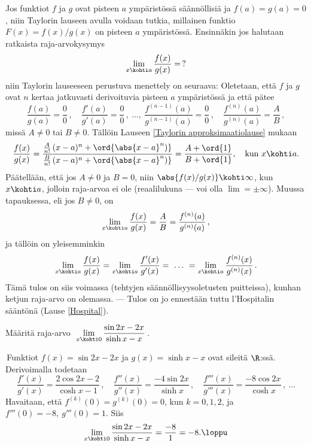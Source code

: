 Jos funktiot $f$ ja $g$ ovat pisteen $a$ ympäristössä säännöllisiä ja $f(a)=g(a)=0$, niin
Taylorin lauseen avulla voidaan tutkia, millainen funktio $F(x)=f(x)/g(x)$ on pisteen $a$
ympäristössä. Ensinnäkin jos halutaan ratkaista raja-arvokysymys
\[
\lim_{x\kohti a} \frac{f(x)}{g(x)}=\,?
\]
niin Taylorin lauseeseen perustuva menettely on seuraava: Oletetaan, että $f$ ja $g$ ovat $n$
kertaa jatkuvasti derivoituvia pisteen $a$ ympäristössä ja että pätee
\[
\frac{f(a)}{g(a)}=\frac{0}{0}\,,\quad \frac{f'(a)}{g'(a)}=\frac{0}{0}\,,\ \ldots,\ 
                                      \frac{f^{(n-1)}(a)}{g^{(n-1)}(a)}=\frac{0}{0}\,, \quad 
                                      \frac{f^{(n)}(a)}{g^{(n)}(a)}=\frac{A}{B}\,,
\]
missä $A \neq 0$ tai $B \neq 0$. Tällöin Lauseen \ref{Taylorin approksimaatiolause} mukaan
\[
\frac{f(x)}{g(x)} = \frac{\frac{A}{n!}\,(x-a)^n + \ord{\abs{x-a}^n)}}{\frac{B}{n!}\,(x-a)^n 
                                                + \ord{\abs{x-a}^n)}}
                  = \frac{A+\ord{1}}{B+\ord{1}}, \quad \text{kun}\ x \kohti a.
\]
Päätellään, että jos $A \neq 0$ ja $B=0$, niin $\abs{f(x)/g(x)}\kohti\infty$, kun
$x \kohti a$, jolloin raja-arvoa ei ole (reaalilukuna --- voi olla $\lim=\pm\infty$). Muussa
tapauksessa, eli jos $B \neq 0$, on
\[
\lim_{x \kohti a} \frac{f(x)}{g(x)} = \frac{A}{B} = \frac{f^{(n)}(a)}{g^{(n)}(a)}\,,
\]
ja tällöin on yleisemminkin
\[
\lim_{x \kohti a} \frac{f(x)}{g(x)} 
               = \lim_{x \kohti a} \frac{f'(x)}{g'(x)} 
               =\ \ldots\ = \lim_{x \kohti a} \frac{f^{(n)}(x)}{g^{(n)}(x)}\,.
\]
Tämä tulos on siis voimassa (tehtyjen säännöllisyysoletusten puitteissa), kunhan ketjun 
\pain{viimeinen} raja-arvo on olemassa. --- Tulos on jo ennestään tuttu l'Hospitalin
sääntönä (Lause \ref{Hospital}).
\begin{Exa} Määritä raja-arvo 
$\ \displaystyle{\lim_{x \kohti 0} \frac{\sin 2x-2x}{\sinh x-x}\,}$. 
\end{Exa}
\ratk \,Funktiot $f(x)=\sin 2x-2x$ ja $g(x)=\sinh x-x$ ovat sileitä $\R$:ssä. Derivoimalla 
todetaan
\[
\frac{f'(x)}{g'(x)}=\frac{2\cos 2x-2}{\cosh x-1}\,, \quad 
\frac{f''(x)}{g''(x)}=\frac{-4\sin 2x}{\sinh x}\,, \quad
\frac{f'''(x)}{g'''(x)}=\frac{-8\cos 2x}{\cosh x}\,,\ \ldots
\]
Havaitaan, että $f^{(k)}(0)=g^{(k)}(0)=0$, kun $k=0,1,2$, ja $f'''(0)=-8,\ g'''(0)=1$. Siis
\[
\lim_{x \kohti 0} \frac{\sin 2x-2x}{\sinh x-x} = \frac{-8}{1} = -8. \loppu
\]

